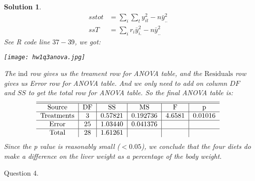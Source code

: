\documentclass[11pt]{article}
\newtheorem{sol}{Solution}
\begin{document}
\begin{sol}
\begin{align*}
		sstot &= \sum_{i}\sum_t y^2_{it} - n\bar{y}^2_{..}\\ 
		ssT &=  \sum_i r_i\bar{y}^2_{i.} - n\bar{y}^2_{..}
	\end{align*}
	See R code line $37-39$, we got:
	\begin{center}
		\texttt{[image: hw1q3anova.jpg]}
	\end{center}
	The $\text{ind}$ row gives us the treament row for ANOVA table, and the $\text{Residuals}$ row gives us Error row for ANOVA table. And we only need to add on column $DF$ and $SS$ to get the total row for ANOVA table. So the final ANOVA table is:
	\begin{align*}
		\begin{tabular}{c|c|c|c|c|c}
		\hline
			\hline
			\text{Source} & \text{DF} & \text{SS} & \text{MS}& \text{F}& \text{p}\\
			\hline
			\text{Treatments} & $3$ & $0.57821$ & $0.192736$ & $4.6581$ & 0.01016\\
			\hline
			\text{Error} & $25$ & $1.03440$ & $0.041376$ &  &\\
			\hline
			\text{Total} & $28$ &$1.61261$ & &&
		\end{tabular}
	\end{align*}
	Since the p value is reasonably small ($<0.05$), we conclude that the four diets do make a difference on the liver weight as a percentage of the body weight.
\end{sol}
Question 4.\vskip 2mm
\end{document}
